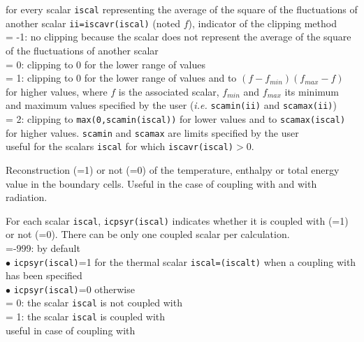 {for every scalar {\tt iscal} representing the average of the square of the
fluctuations of another scalar {\tt ii=iscavr(iscal)} (noted $f$),
indicator of the clipping method\\
\hspace*{1.3cm}= -1: no clipping because the scalar does not represent
the average of the square of the fluctuations of another scalar\\
\hspace*{1.3cm}= 0: clipping to 0 for the lower range of values\\
\hspace*{1.3cm}= 1: clipping to 0 for the lower range of values and to
\mbox{$(f-f_{min})(f_{max}-f)$} for higher values, where $f$ is
the associated scalar, $f_{min}$ and $f_{max}$ its minimum and maximum
values specified by the user ({\em i.e.} {\tt scamin(ii)} and {\tt scamax(ii)}) \\
\hspace*{1.3cm}= 2: clipping to {\tt max(0,scamin(iscal))} for lower
values and to {\tt scamax(iscal)} for higher values. {\tt scamin} and {\tt scamax}
are limits specified by the user\\
useful for the scalars {\tt iscal} for which {\tt iscavr(iscal)}$>$0.}

{Reconstruction (=1) or not (=0) of the temperature, enthalpy or total energy
value in the boundary cells. Useful in the case of coupling with \syrthes
and with radiation.}

{For each scalar {\tt iscal}, {\tt icpsyr(iscal)} indicates whether it is
coupled with \syrthes (=1) or not (=0).
There can be only one coupled scalar per calculation.\\
\hspace*{1.3cm}=-999: by default\\
\hspace*{2.cm} $\bullet$ {\tt icpsyr(iscal)}=1 for the thermal scalar
{\tt iscal=(iscalt)} when a coupling with \syrthes has been specified\\
\hspace*{2.cm} $\bullet$ {\tt icpsyr(iscal)}=0 otherwise\\
\hspace*{1.3cm}= 0: the scalar {\tt iscal} is not coupled with \syrthes\\
\hspace*{1.3cm}= 1: the scalar {\tt iscal} is coupled with \syrthes\\
useful in case of coupling with \syrthes}


